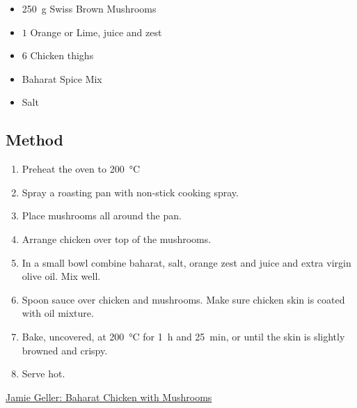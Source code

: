 \documentclass[11pt,a4paper]{article}
\begin{document}
\begin{itemize}
  \item \qty{250}{\gram} Swiss Brown Mushrooms
  \item $ 1 $ Orange or Lime, juice and zest
  \item $ 6 $ Chicken thighs
  \item Baharat Spice Mix
  \item Salt
\end{itemize}

\medskip

\subsection*{Method}

\begin{enumerate}
  \item Preheat the oven to \qty{200}{\celsius}
  \item Spray a roasting pan with non-stick cooking spray.
  \item Place mushrooms all around the pan.
  \item Arrange chicken over top of the mushrooms.
  \item In a small bowl combine baharat, salt, orange zest and juice and extra
  virgin olive oil. Mix well.
  \item Spoon sauce over chicken and mushrooms. Make sure chicken skin is
  coated with oil mixture.
  \item Bake, uncovered, at \qty{200}{\celsius} for \qty{1}{\hour} and
  \qty{25}{\minute}, or until the skin is slightly browned and crispy.
  \item Serve hot.
\end{enumerate}

\href{https://jamiegeller.com/recipes/baharat-chicken-with-mushrooms/}{Jamie Geller: Baharat Chicken with Mushrooms}
\end{document}
